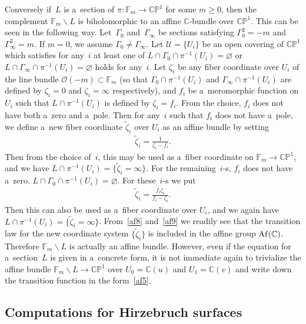 Conversely if~$L$ is a~section of $\pi:\mathbb{F}_m\to\mathbb{CP}^1$ for some $m\ge 0$, then the complement
$\mathbb{F}_m\backslash L$ is biholomorphic to an af\/f\/ine $\mathbb{C}$-bundle over $\mathbb{CP}^1$.
This can be seen in the following way.
Let~$\Gamma_0$ and~$\Gamma_{\infty}$ be sections satisfying $\Gamma_0^2 = -m$ and $\Gamma_{\infty}^2 = m$.
If $m=0$, we assume $\Gamma_0\neq \Gamma_{\infty}$.
Let $\mathscr U=\{U_i\}$ be an open covering of $\mathbb{CP}^1$ which satisf\/ies for any~$i$ at least one of $L\cap
\Gamma_0\cap \pi^{-1} (U_i)=\varnothing$ or $L\cap \Gamma_{\infty}\cap \pi^{-1} (U_i)=\varnothing$ holds for any~$i$.
Let $\zeta_i$ be any f\/iber coordinate over $U_i$ of the line bundle $\mathscr O(-m)\subset\mathbb{F}_m$ (so that
$\Gamma_0\cap\pi^{-1} (U_i)$ and $\Gamma_{\infty}\cap\pi^{-1} (U_i)$ are def\/ined by $\zeta_i=0$ and $\zeta_i=\infty$
respectively), and $f_i$ be a~meromorphic function on $U_i$ such that $L\cap\pi^{-1} (U_i)$ is def\/ined by $\zeta_i =
f_i$.
From the choice, $f_i$ does not have both a~zero and a~pole.
Then for any~$i$ such that $f_i$ does not have a~pole, we def\/ine a~new f\/iber coordinate $\tilde{\zeta}_i$ over $U_i$
as an af\/f\/ine bundle by setting
\begin{gather}
\label{af8}
\tilde{\zeta}_i = \frac 1{\zeta_i-f_i}.
\end{gather}
Then from the choice of~$i$, this may be used as a~f\/iber coordinate on $\mathbb{F}_m\to\mathbb{CP}^1$, and we have
$L\cap \pi^{-1}(U_i) = \{\tilde{\zeta}_i = \infty\}$.
For the remaining~$i$-s, $f_i$ does not have a~zero.
$L\cap \Gamma_0 \cap \pi^{-1} (U_i)=\varnothing$.
For these~$i$-s we put
\begin{gather}
\label{af9}
\tilde{\zeta}_i = \frac{f_i\zeta_i}{f_i-\zeta_i}.
\end{gather}
Then this can also be used as a~f\/iber coordinate over $U_i$, and we again have $L\cap \pi^{-1}(U_i) =
\{\tilde{\zeta}_i = \infty\}$.
From~\eqref{af8} and~\eqref{af9} we readily see that the transition law for the new coordinate system
$\{\tilde{\zeta}_i\}$ is included in the af\/f\/ine group ${\rm Af}(\mathbb{C})$.
Therefore $\mathbb{F}_m\backslash L$ is actually an af\/f\/ine bundle.
However, even if the equation for a~section~$L$ is given in a~concrete form, it is not immediate again to trivialize the
af\/f\/ine bundle $\mathbb{F}_m\backslash L\to\mathbb{CP}^1$ over $U_0=\mathbb{C}(u)$ and $U_1=\mathbb{C}(v)$ and write
down the transition function in the form~\eqref{af5}.

\subsection{Computations for Hirzebruch surfaces}

